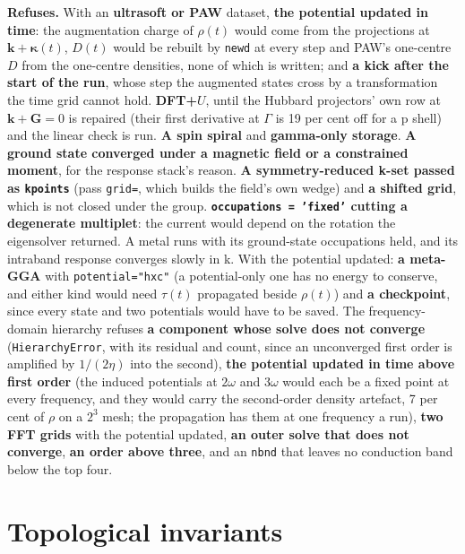 \documentclass[11pt,a4paper]{article}
\newcommand{\code}[1]{\texttt{\small #1}}
\begin{document}
\begin{refuses}
\textbf{Refuses.} With an \textbf{ultrasoft or PAW} dataset, \textbf{the potential
updated in time}: the augmentation charge of $\rho(t)$ would come from the
projections at $\mathbf k+\boldsymbol\kappa(t)$, $D(t)$ would be rebuilt by
\code{newd} at every step and PAW's one-centre $D$ from the one-centre densities,
none of which is written; and \textbf{a kick after the start of the run}, whose
step the augmented states cross by a transformation the time grid cannot hold.
\textbf{DFT+$U$}, until the Hubbard projectors' own row at
$\mathbf k+\mathbf G=0$ is repaired (their first derivative at $\Gamma$ is 19 per
cent off for a p shell) and the linear check is run. \textbf{A spin spiral} and
\textbf{gamma-only storage}. \textbf{A ground state converged under a magnetic
field or a constrained moment}, for the response stack's reason.
\textbf{A symmetry-reduced k-set passed as \code{kpoints}} (pass \code{grid=}, which
builds the field's own wedge) and \textbf{a shifted grid}, which is not closed
under the group. \textbf{\code{occupations = 'fixed'} cutting a degenerate
multiplet}: the current would depend on the rotation the eigensolver returned.
A metal runs with its ground-state occupations held, and its intraband response
converges slowly in k. With the potential updated: \textbf{a meta-GGA} with
\code{potential="hxc"} (a potential-only one has no energy to conserve, and
either kind would need $\tau(t)$ propagated beside $\rho(t)$) and \textbf{a
checkpoint}, since every state and two potentials would have to be saved. The
frequency-domain hierarchy refuses \textbf{a component whose solve does not
converge} (\code{HierarchyError}, with its residual and count, since an
unconverged first order is amplified by $1/(2\eta)$ into the second),
\textbf{the potential updated in time above first order} (the induced potentials
at $2\omega$ and $3\omega$ would each be a fixed point at every frequency, and they
would carry the second-order density artefact, 7 per cent of $\rho$ on a $2^3$
mesh; the propagation has them at one frequency a run), \textbf{two FFT grids}
with the potential updated, \textbf{an outer solve that does not converge},
\textbf{an order above three}, and an \code{nbnd} that leaves no conduction band
below the top four.
\end{refuses}

\section{Topological invariants}
\end{document}
